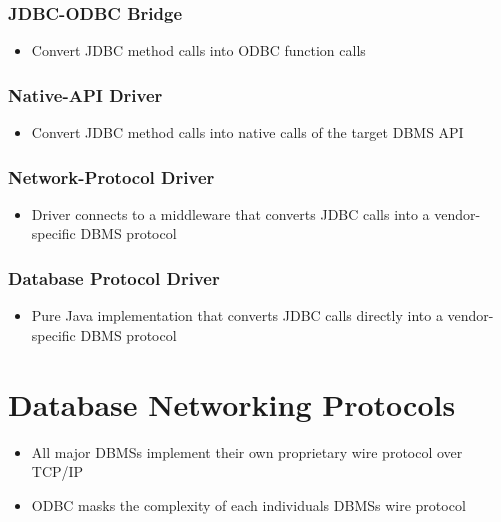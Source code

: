 \documentclass[11pt]{article}
\begin{document}
\begin{itemize}
\begin{itemize}
        \subsubsection*{JDBC-ODBC Bridge}
        \begin{itemize}
            \item Convert JDBC method calls into ODBC function calls
        \end{itemize}

        \subsubsection*{Native-API Driver}
        \begin{itemize}
            \item Convert JDBC method calls into native calls of the target DBMS API
        \end{itemize}

        \subsubsection*{Network-Protocol Driver}
        \begin{itemize}
            \item Driver connects to a middleware that converts JDBC calls into a vendor-specific DBMS protocol
        \end{itemize}

        \subsubsection*{Database Protocol Driver}
        \begin{itemize}
            \item Pure Java implementation that converts JDBC calls directly into a vendor-specific DBMS protocol
        \end{itemize}
    \end{itemize}

\end{itemize}


\section{Database Networking Protocols}
\begin{itemize}
    \item All major DBMSs implement their own proprietary wire protocol over TCP/IP
    \item ODBC masks the complexity of each individuals DBMSs wire protocol
\end{itemize}
\end{document}
